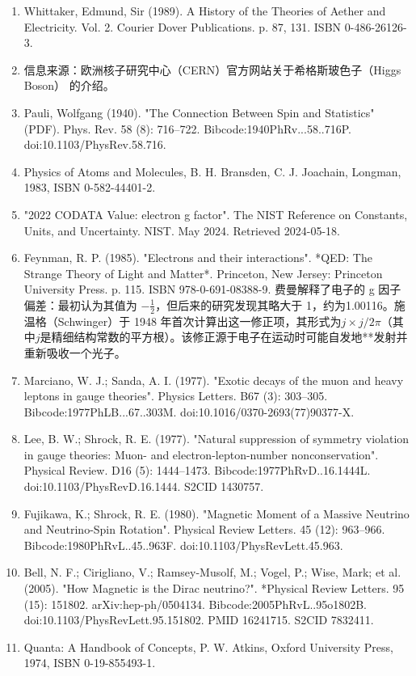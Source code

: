 \begin{enumerate}
\item Whittaker, Edmund, Sir (1989). A History of the Theories of Aether and Electricity. Vol. 2. Courier Dover Publications. p. 87, 131. ISBN 0-486-26126-3.  
\item 信息来源：欧洲核子研究中心（CERN）官方网站关于希格斯玻色子（Higgs Boson） 的介绍。  
\item Pauli, Wolfgang (1940). "The Connection Between Spin and Statistics" (PDF). Phys. Rev. 58 (8): 716–722. Bibcode:1940PhRv...58..716P. doi:10.1103/PhysRev.58.716.  
\item Physics of Atoms and Molecules, B. H. Bransden, C. J. Joachain, Longman, 1983, ISBN 0-582-44401-2.  
\item "2022 CODATA Value: electron g factor". The NIST Reference on Constants, Units, and Uncertainty. NIST. May 2024. Retrieved 2024-05-18.  
\item Feynman, R. P. (1985). "Electrons and their interactions". *QED: The Strange Theory of Light and Matter*. Princeton, New Jersey: Princeton University Press. p. 115. ISBN 978-0-691-08388-9. 费曼解释了电子的 g 因子偏差：最初认为其值为 −\( \frac{1}{2} \)，但后来的研究发现其略大于 1，约为1.00116。施温格（Schwinger）于 1948 年首次计算出这一修正项，其形式为\( j \times j / 2\pi \)（其中\( j \)是精细结构常数的平方根）。该修正源于电子在运动时可能自发地**发射并重新吸收一个光子。  
\item Marciano, W. J.; Sanda, A. I. (1977). "Exotic decays of the muon and heavy leptons in gauge theories". Physics Letters. B67 (3): 303–305. Bibcode:1977PhLB...67..303M. doi:10.1016/0370-2693(77)90377-X.  
\item Lee, B. W.; Shrock, R. E. (1977). "Natural suppression of symmetry violation in gauge theories: Muon- and electron-lepton-number nonconservation". Physical Review. D16 (5): 1444–1473. Bibcode:1977PhRvD..16.1444L. doi:10.1103/PhysRevD.16.1444. S2CID 1430757.  
\item Fujikawa, K.; Shrock, R. E. (1980). "Magnetic Moment of a Massive Neutrino and Neutrino-Spin Rotation". Physical Review Letters. 45 (12): 963–966. Bibcode:1980PhRvL..45..963F. doi:10.1103/PhysRevLett.45.963.  
\item Bell, N. F.; Cirigliano, V.; Ramsey-Musolf, M.; Vogel, P.; Wise, Mark; et al. (2005). "How Magnetic is the Dirac neutrino?". *Physical Review Letters. 95 (15): 151802. arXiv:hep-ph/0504134. Bibcode:2005PhRvL..95o1802B. doi:10.1103/PhysRevLett.95.151802. PMID 16241715. S2CID 7832411.  
\item Quanta: A Handbook of Concepts, P. W. Atkins, Oxford University Press, 1974, ISBN 0-19-855493-1.  

\end{enumerate}
